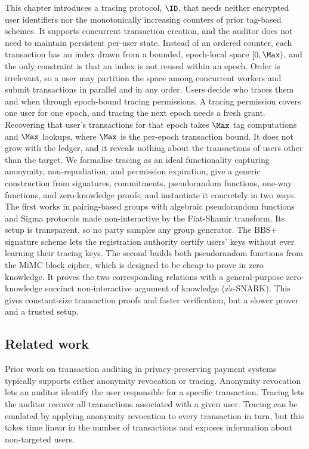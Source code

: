 This chapter introduces a tracing protocol, $\ID$, that needs neither
encrypted user identifiers nor the monotonically increasing counters of prior
tag-based schemes. It supports concurrent transaction creation, and the auditor
does not need to maintain persistent per-user state. Instead of an ordered counter, each
transaction has an index drawn from a bounded, epoch-local space $[0,\Max)$,
and the only constraint is that an index is not reused within an epoch. Order is
irrelevant, so a user may partition the space among concurrent workers and
submit transactions in parallel and in any order. Users decide who traces them
and when through epoch-bound tracing permissions. A tracing permission covers one user for one epoch, and
tracing the next epoch needs a fresh grant.
Recovering that user's transactions for that epoch takes $\Max$ tag
computations and $\Max$ lookups, where $\Max$ is the per-epoch transaction bound. It does not grow with the ledger, and it
reveals nothing about the transactions of users other than the target. We
formalise tracing as an ideal
functionality capturing anonymity, non-repudiation, and permission expiration,
give a generic construction from signatures, commitments, pseudorandom
functions, one-way functions, and zero-knowledge proofs, and instantiate it
concretely in two ways. The first works in pairing-based groups with algebraic
pseudorandom functions and Sigma protocols made non-interactive by the
Fiat-Shamir transform. Its setup is transparent, so no party samples any group
generator. The BBS+ signature scheme lets the registration authority certify
users' keys without ever learning their tracing keys. The second builds both
pseudorandom functions from the MiMC block cipher, which is designed to be cheap
to prove in zero knowledge. It proves the two corresponding relations with a
general-purpose zero-knowledge succinct non-interactive argument of knowledge
(zk-SNARK). This gives constant-size transaction proofs and faster verification,
but a slower prover and a trusted setup.

\subsection*{Related work}

Prior work on transaction auditing in privacy-preserving payment systems
typically supports either anonymity revocation or tracing.  Anonymity revocation
lets an auditor identify the user responsible for a specific transaction.
Tracing lets the auditor recover all transactions associated with
a given user. Tracing can be emulated by applying anonymity revocation to every
transaction in turn, but this takes time linear in the number of transactions
and exposes information about non-targeted users.

